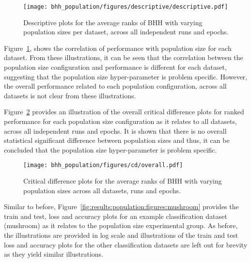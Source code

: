 \begin{figure}[htb]
	\centering
	\texttt{[image: bhh\_population/figures/descriptive/descriptive.pdf]}
	\caption{Descriptive plots for the average ranks of \acs{BHH} with varying population sizes per dataset, across all independent runs and epochs.}
	\label{fig:results:population:descriptive:descriptive}
\end{figure}

Figure~\ref{fig:results:population:descriptive:descriptive}, shows the correlation of performance with population size for each dataset. From these illustrations, it can be seen that the correlation between the population size configuration and performance is different for each dataset, suggesting that the population size hyper-parameter is problem specific. However, the overall performance related to each population configuration, across all datasets is not clear from these illustrations.

Figure~\ref{fig:results:population:descriptive:cd} provides an illustration of the overall critical difference plots for ranked performance for each population size configuration as it relates to all datasets, across all independent runs and epochs. It is shown that there is no overall statistical significant difference between population sizes and thus, it can be concluded that the population size hyper-parameter is problem specific.

\begin{figure}[htb]
	\centering
	\texttt{[image: bhh\_population/figures/cd/overall.pdf]}
	\caption{Critical difference plots for the average ranks of \acs{BHH} with varying population sizes across all datasets, runs and epochs.}
	\label{fig:results:population:descriptive:cd}
\end{figure}

Similar to before, Figure~\ref{fig:results:population:figures:mushroom} provides the train and test, loss and accuracy plots for an example classification dataset (mushroom) as it relates to the population size experimental group. As before, the illustrations are provided in log scale and illustrations of the train and test loss and accuracy plots for the other classification datasets are left out for brevity as they yield similar illustrations.

